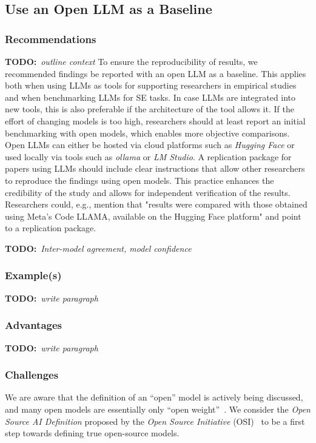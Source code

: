 \documentclass[11pt]{article}
\newcommand{\todo}[1]{{\textbf{TODO:}\ \textit{#1}}} %
\begin{document}
\subsection{Use an Open LLM as a Baseline}

\subsubsection{Recommendations}

\todo{outline context}
To ensure the reproducibility of results, we recommended findings be reported with an open LLM as a baseline.
This applies both when using LLMs as tools for supporting researchers in empirical studies and when benchmarking LLMs for SE tasks.
In case LLMs are integrated into new tools, this is also preferable if the architecture of the tool allows it.
If the effort of changing models is too high, researchers should at least report an initial benchmarking with open models, which enables more objective comparisons.
Open LLMs can either be hosted via cloud platforms such as \emph{Hugging Face} or used locally via tools such as \emph{ollama} or \emph{LM Studio}.
A replication package for papers using LLMs should include clear instructions that allow other researchers to reproduce the findings using open models.
This practice enhances the credibility of the study and allows for independent verification of the results. 
Researchers could, e.g., mention that "results were compared with those obtained using Meta’s Code LLAMA, available on the Hugging Face platform" and point to a replication package.

\todo{Inter-model agreement, model confidence}


\subsubsection{Example(s)}

\todo{write paragraph}


\subsubsection{Advantages}

\todo{write paragraph}


\subsubsection{Challenges}

We are aware that the definition of an ``open'' model is actively being discussed, and many open models are essentially only ``open weight''~\cite{Gibney2024}.
We consider the \emph{Open Source AI Definition} proposed by the \emph{Open Source Initiative} (OSI)~\cite{OSIAI2024} to be a first step towards defining true open-source models.
\end{document}
